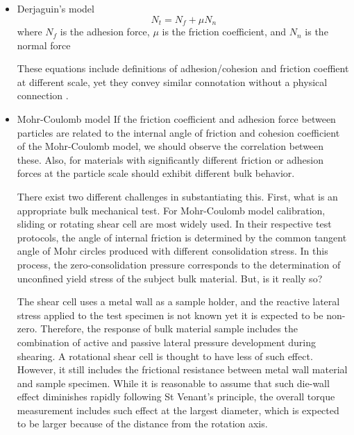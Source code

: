 \documentclass[xcolor=dvipsnames,10pt,hidelinks]{article}
\begin{document}
\begin{itemize}
\item Derjaguin's model
\label{sec:org6b0cf2b}
\begin{equation}
  N_t =  N_f + \mu N_n
\end{equation}
where \(N_f\) is the adhesion force, \(\mu\) is the friction coefficient, and \(N_n\) is the normal force

These equations include definitions of adhesion/cohesion and friction coeffient at different scale, yet they convey similar connotation without a physical connection  \parencite{reynolds_lvii_1885}.
\item Mohr-Coulomb model
\label{sec:org8b81416}
If the friction coefficient and adhesion force between particles are related to the internal angle of friction and cohesion coefficient of the Mohr-Coulomb model, we should observe the correlation between these.
Also, for materials with significantly different friction or adhesion forces at the particle scale should exhibit different bulk behavior.

There exist two different challenges in substantiating this.
First, what is an appropriate bulk mechanical test. For Mohr-Coulomb model calibration, sliding or rotating shear cell are most widely used.
In their respective test protocols, the angle of internal friction is determined by the common tangent angle of Mohr circles produced with different consolidation stress.
In this process, the zero-consolidation pressure corresponds to the determination of unconfined yield stress of the subject bulk material.
But, is it really so?

The shear cell uses a metal wall as a sample holder, and the reactive lateral stress applied to the test specimen is not known yet it is expected to be non-zero.  Therefore, the response of bulk material sample includes the combination of active and passive lateral pressure development during shearing.
A rotational shear cell is thought to have less of such effect.
However, it still includes the frictional resistance between metal wall material and sample specimen.
While it is reasonable to assume that such die-wall effect diminishes rapidly following St Venant's principle,
the overall torque measurement includes such effect at the largest diameter, which is expected to be larger because of the distance from the rotation axis.


\end{itemize}
\end{document}
